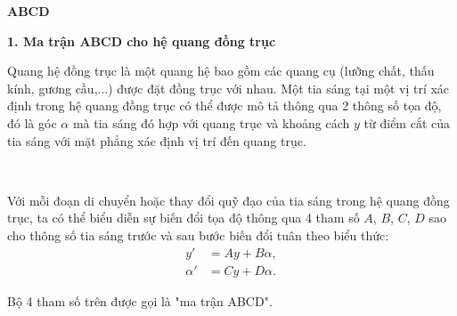 \textbf{ABCD}

\textbf{1. Ma trận ABCD cho hệ quang đồng trục}

Quang hệ đồng trục là một quang hệ bao gồm các quang cụ (lưỡng chất, thấu kính, gương cầu,...) được đặt đồng trục với nhau. Một tia sáng tại một vị trí xác định trong hệ quang đồng trục có thể được mô tả thông qua 2 thông số tọa độ, đó là góc \(\alpha\) mà tia sáng đó hợp với quang trục và khoảng cách \(y\) từ điểm cắt của tia sáng với mặt phẳng xác định vị trí đến quang trục. 

\ \ 

Với mỗi đoạn di chuyển hoặc thay đổi quỹ đạo của tia sáng trong hệ quang đồng trục, ta có thể biểu diễn sự biến đổi tọa độ thông qua 4 tham số \(A\), \(B\), \(C\), \(D\) sao cho thông số tia sáng trước và sau bước biến đổi tuân theo biểu thức:
\begin{align*}
    y' &= A y + B \alpha , \\
    \alpha' &= C y + D \alpha .
\end{align*}

Bộ 4 tham số trên được gọi là "ma trận ABCD".

